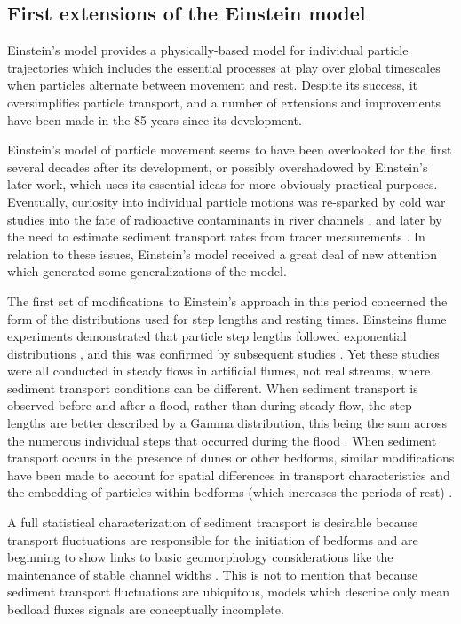 \subsection{First extensions of the Einstein model}

Einstein's model provides a physically-based model for individual particle trajectories which includes the essential processes at play over global timescales when particles alternate between movement and rest. Despite its success, it oversimplifies particle transport, and a number of extensions and improvements have been made in the 85 years since its development.

Einstein's model of particle movement seems to have been overlooked for the first several decades after its development, or possibly overshadowed by Einstein's later work, which uses its essential ideas for more obviously practical purposes.
Eventually, curiosity into individual particle motions was re-sparked by cold war studies into the fate of radioactive contaminants in river channels \citep{Crickmore1962, Hubbell1964, Sayre1965,Yang1971}, and later by the need to estimate sediment transport rates from tracer measurements \citep{Yano1969, Todorovic1975, Nakagawa1976, Nakagawa1980, Hassan1991}. In relation to these issues, Einstein's model received a great deal of new attention which generated some generalizations of the model.

The first set of modifications to Einstein's approach in this period concerned the form of the distributions used for step lengths and resting times. Einsteins flume experiments demonstrated that particle step lengths followed exponential distributions \citep{1937}, and this was confirmed by subsequent studies \citep{Yano1969, Nakagawa1976}. Yet these studies were all conducted in steady flows in artificial flumes, not real streams, where sediment transport conditions can be different. When sediment transport is observed before and after a flood, rather than during steady flow, the step lengths are better described by a Gamma distribution, this being the sum across the numerous individual steps that occurred during the flood \citep{Hassan1991}. When sediment transport occurs in the presence of dunes or other bedforms, similar modifications have been made to account for spatial differences in transport characteristics \citep{Crickmore1962, Hubbell1964, Sayre1965} and the embedding of particles within bedforms (which increases the periods of rest) \citep{Yang1971,Nakagawa1980}.

A full statistical characterization of sediment transport is desirable because transport fluctuations are responsible for the initiation of bedforms \citep{Jerolmack2005,Bohorquez2016} and are beginning to show links to basic geomorphology considerations like the maintenance of stable channel widths \citep{Abramian2019,Abramian2020}.
This is not to mention that because sediment transport fluctuations are ubiquitous, models which describe only mean bedload fluxes signals are conceptually incomplete.

